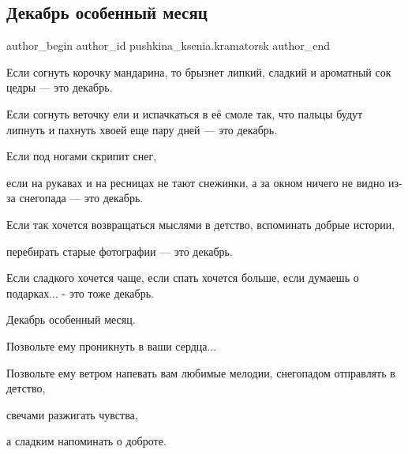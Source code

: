  
 
 
 
 
 
\subsection{Декабрь особенный месяц}
\label{sec:04_12_2021.fb.pushkina_ksenia.kramatorsk.1.dekabrj}
 
\ifcmt
 author_begin
   author_id pushkina_ksenia.kramatorsk
 author_end
\fi

Если согнуть корочку мандарина, то брызнет липкий, сладкий и ароматный сок
цедры — это декабрь.


Если согнуть веточку ели и испачкаться в её смоле так, что пальцы будут липнуть
и пахнуть хвоей еще пару дней — это декабрь.

Если под ногами скрипит снег,

если на рукавах и на ресницах не тают снежинки, а за окном ничего не видно
из-за снегопада — это декабрь.

Если так хочется возвращаться мыслями в детство, вспоминать добрые истории,

перебирать старые фотографии — это декабрь.

Если сладкого хочется чаще, если спать хочется больше, если думаешь о
подарках... - это тоже декабрь.

Декабрь особенный месяц.


Позвольте ему проникнуть в ваши сердца...

Позвольте ему ветром напевать вам любимые мелодии, снегопадом отправлять в
детство,

свечами разжигать чувства,

а сладким напоминать о доброте.
